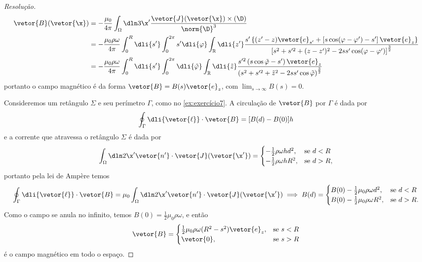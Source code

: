 \begin{proof}[Resolução]
    \begin{align*}
        \vetor{B}(\vetor{\x})
        &=-\frac{\mu_0}{4\pi} \int_{\Omega} \dln3{\x'} \frac{\vetor{J}(\vetor{\x})\times (\D)}{\norm{\D}^3} \\
        &=-\frac{\mu_0 \rho \omega}{4\pi} \int_{0}^R \dli{s'} \int_{0}^{2\pi} s' \dli{\varphi} \int_{\mathbb{R}} \dli{z'} \frac{s'\left\{(z' - z) \vetor{e}_{s'} + \left[s \cos(\varphi - \varphi') - s'\right]\vetor{e}_z\right\}}{\left[s^2 + s'^2 + (z - z')^2 - 2s s' \cos(\varphi - \varphi')\right]^{\frac32}}\\
        &=-\frac{\mu_0 \rho \omega}{4\pi} \int_0^R\dli{s'}\int_0^{2\pi} \dli{\tilde{\varphi}}\int_{\mathbb{R}}\dli{\tilde{z}} \frac{s'^2\left(s \cos\tilde{\varphi} - s'\right)\vetor{e}_z}{\left(s^2 + s'^2 + \tilde{z}^2 - 2s s' \cos\tilde{\varphi}\right)^{\frac32}}
    \end{align*}
    portanto o campo magnético é da forma \(\vetor{B} = B(s) \vetor{e}_z\), com \(\displaystyle\lim_{s \to \infty}{B(s)} = 0\).

    Consideremos um retângulo \(\Sigma\) e seu perímetro \(\Gamma\), como no \cref{ex:exercício7}. A circulação de \(\vetor{B}\) por \(\Gamma\) é dada por
    \begin{equation*}
        \oint_{\Gamma}\dli{\vetor{\ell}}\cdot\vetor{B} = [B(d) - B(0)]h
    \end{equation*}
    e a corrente que atravessa o retângulo \(\Sigma\) é dada por
    \begin{equation*}
        \int_{\Omega} \dln2{\x'} \vetor{n'}\cdot \vetor{J}(\vetor{\x'}) = \begin{cases}
            -\frac12\rho \omega h d^2,&\text{se }d < R\\
            -\frac12 \rho \omega h R^2,&\text{se }d > R,
        \end{cases}
    \end{equation*}
    portanto pela lei de Ampère temos
    \begin{equation*}
        \oint_{\Gamma}\dli{\vetor{\ell}}\cdot\vetor{B} =\mu_0 \int_{\Omega} \dln2{\x'} \vetor{n'}\cdot \vetor{J}(\vetor{\x'})  \implies B(d) = \begin{cases}
            B(0)-\frac12\mu_0\rho \omega  d^2,&\text{se }d < R\\
            B(0)-\frac12\mu_0\rho \omega  R^2,&\text{se }d > R.
        \end{cases}
    \end{equation*}
    Como o campo se anula no infinito, temos \(B(0) = \frac12 \mu_0 \rho \omega\), e então
    \begin{equation*}
        \vetor{B} = \begin{cases}
            \frac12 \mu_0 \rho \omega (R^2 - s^2)\vetor{e}_z,&\text{se }s < R\\
            \vetor{0},&\text{se }s > R
        \end{cases}
    \end{equation*}
    é o campo magnético em todo o espaço.


\end{proof}
